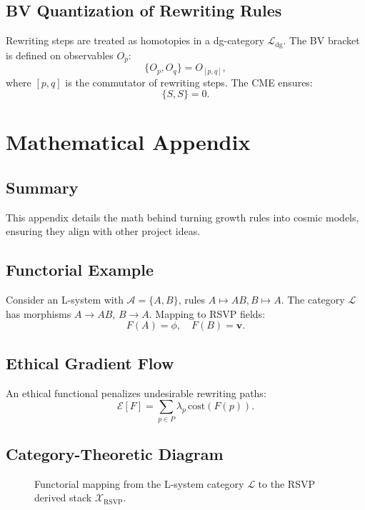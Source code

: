 \documentclass[11pt,oneside]{memoir}
\theoremstyle{plain}
\newcommand{\X}{\mathcal{X}}
\newcommand{\A}{\mathcal{A}}
\newcommand{\Lcal}{\mathcal{L}} %
\begin{document}
\subsection{BV Quantization of Rewriting Rules}
Rewriting steps are treated as homotopies in a dg-category \(\Lcal_{\mathrm{dg}}\). The BV bracket is defined on observables \(O_p\):
\begin{equation}
    \{O_p, O_q\} = O_{[p,q]},
\end{equation}
where \([p,q]\) is the commutator of rewriting steps. The CME ensures:
\begin{equation}
    \{ S, S \} = 0.
\end{equation}

\section{Mathematical Appendix}
\subsection{Summary}
This appendix details the math behind turning growth rules into cosmic models, ensuring they align with other project ideas.

\subsection{Functorial Example}
Consider an L-system with \(\A = \{A,B\}\), rules \(A \mapsto AB, B \mapsto A\). The category \(\Lcal\) has morphisms \(A \to AB\), \(B \to A\). Mapping to RSVP fields:
\begin{equation}
    F(A) = \phi, \quad F(B) = \mathbf{v}.
\end{equation}

\subsection{Ethical Gradient Flow}
An ethical functional penalizes undesirable rewriting paths:
\begin{equation}
    \mathcal{E}[F] = \sum_{p \in P} \lambda_p \, \mathrm{cost}(F(p)).
\end{equation}

\subsection{Category-Theoretic Diagram}
\begin{figure}[h]
    \centering
    \caption{Functorial mapping from the L-system category \(\Lcal\) to the RSVP derived stack \(\X_{\mathrm{RSVP}}\).}
    \label{fig:l_system_functor}
\end{figure}
\end{document}
